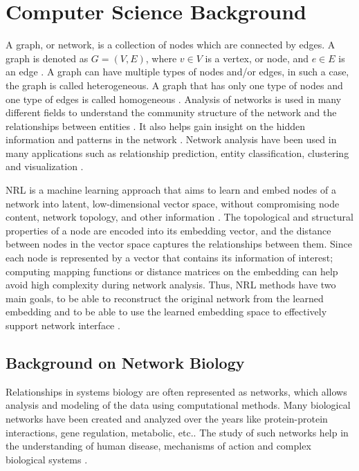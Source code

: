 \chapter{Computer Science Background}
\label{ch:computerscience}

A graph, or network, is a collection of nodes which are connected by edges.
A graph is denoted as $G=(V,E)$, where $v \in V$ is a vertex, or node, and $e \in E$ is an edge \cite{cai_comprehensive_2017}.
A graph can have multiple types of nodes and/or edges, in such a case, the graph is called heterogeneous.
A graph that has only one type of nodes and one type of edges is called homogeneous \cite{cai_comprehensive_2017}.
Analysis of networks is used in many different fields to understand the community structure of the network and the relationships between entities \cite{cai_comprehensive_2017}.
It also helps gain insight on the hidden information and patterns in the network \cite{cai_comprehensive_2017}.
Network analysis have been used in many applications such as relationship prediction, entity classification, clustering and visualization \cite{goyal_graph_2018}.

\ac{NRL} is a machine learning approach that aims to learn and embed nodes of a network into latent, low-dimensional vector space, without compromising node content, network topology, and other information \cite{zhang_network_2017}.
The topological and structural properties of a node are encoded into its embedding vector, and the distance between nodes in the vector space captures the relationships between them.
Since each node is represented by a vector that contains its information of interest; computing mapping functions or distance matrices on the embedding can help avoid high complexity during network analysis.
Thus, \ac{NRL} methods have two main goals, to be able to reconstruct the original network from the learned embedding and to be able to use the learned embedding space to effectively support network interface \cite{sheikh_gat2vec:_2018}.

\section{Background on Network Biology}

Relationships in systems biology are often represented as networks, which allows analysis and modeling of the data using computational methods.
Many biological networks have been created and analyzed over the years like protein-protein interactions, gene regulation, metabolic, etc..
The study of such networks help in the understanding of human disease, mechanisms of action and complex biological systems \cite{dancik_properties_2013}.

